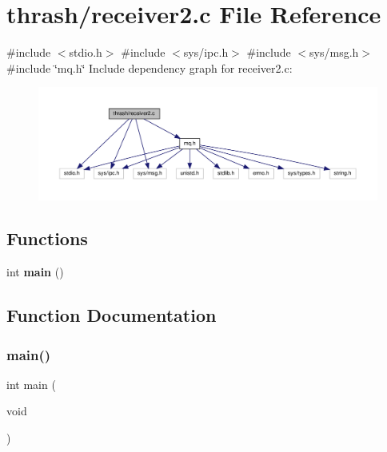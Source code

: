 \section{thrash/receiver2.c File Reference}
\label{receiver2_8c}
{\ttfamily \#include $<$stdio.\+h$>$}\newline
{\ttfamily \#include $<$sys/ipc.\+h$>$}\newline
{\ttfamily \#include $<$sys/msg.\+h$>$}\newline
{\ttfamily \#include \char`\"{}mq.\+h\char`\"{}}\newline
Include dependency graph for receiver2.\+c\+:
\nopagebreak
\begin{figure}[H]
\begin{center}
\leavevmode
\includegraphics[width=350pt]{receiver2_8c__incl}
\end{center}
\end{figure}
\subsection*{Functions}
\begin{DoxyCompactItemize}
\item 
int \textbf{ main} ()
\end{DoxyCompactItemize}


\subsection{Function Documentation}
\mbox{\label{receiver2_8c_ae66f6b31b5ad750f1fe042a706a4e3d4}} 
\subsubsection{main()}
{\footnotesize\ttfamily int main (\begin{DoxyParamCaption}\item[{void}]{ }\end{DoxyParamCaption})}

